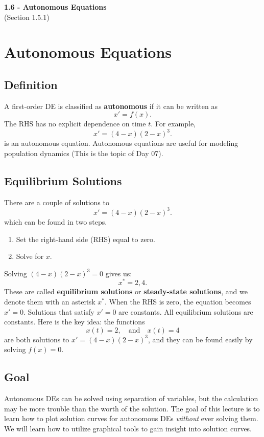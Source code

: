 \documentclass[09pt,letterpaper]{article}
\begin{document}
\begin{center}
\Large\textbf{1.6 - Autonomous Equations}\\
\normalsize (Section 1.5.1)
\end{center}


\section{Autonomous Equations}

\subsection{Definition}
A first-order DE is classified as \textbf{autonomous} if it can be written as
\[
x' = f(x).
\]
The RHS has no explicit dependence on time $t$. For example,
\[
x' = (4-x)(2-x)^3.
\]
is an autonomous equation. Autonomous equations are useful for modeling population dynamics (This is the topic of Day 07). 

\subsection{Equilibrium Solutions}
There are a couple of solutions to 
\[
x' = (4-x)(2-x)^3.
\]
which can be found in two steps. 
\begin{enumerate}
\item Set the right-hand side (RHS) equal to zero.
\item Solve for $x$. 
\end{enumerate}
Solving $(4-x)(2-x)^3=0$ gives us:
$$
x^* = 2,4.
$$
These are called \textbf{equilibrium solutions} or \textbf{steady-state solutions}, and we denote them with an asterisk $x^*$. When the RHS is zero, the equation becomes $x'=0$. Solutions that satisfy $x'=0$ are constants. All equilibrium solutions are constants. Here is the key idea: the functions 
$$
    x(t)=2, \quad \text{and}\quad x(t)=4
$$
are both solutions to $x'=(4-x)(2-x)^3$, and they can be found easily by solving $f(x)=0$.

\subsection{Goal}
Autonomous DEs can be solved using separation of variables, but the calculation may be more trouble than the worth of the solution. The goal of this lecture is to learn how to plot solution curves for autonomous DEs \textit{without} ever solving them. We will learn how to utilize graphical tools to gain insight into solution curves.
\end{document}
